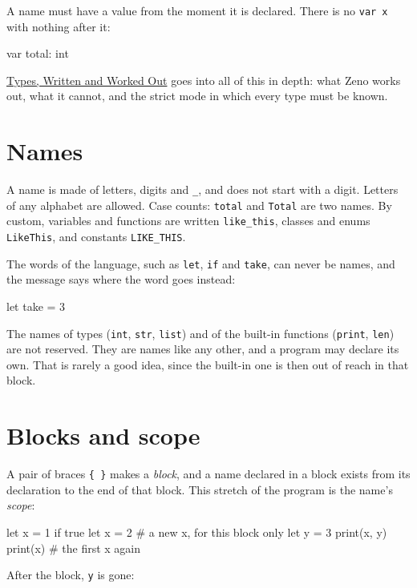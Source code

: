 A name must have a value from the moment it is declared. There is no
\verb|var x| with nothing after it:

\begin{zeno}[fails=yes]
var total: int
\end{zeno}

\hyperref[ch-types]{Types, Written and Worked Out} goes into all of
this in depth: what Zeno works out, what it cannot, and the strict
mode in which every type must be known.

\section{Names}

A name is made of letters, digits and \verb|_|, and does not start
with a digit. Letters of any alphabet are allowed. Case counts:
\verb|total| and \verb|Total| are two names. By custom, variables and
functions are written \verb|like_this|, classes and enums
\verb|LikeThis|, and constants \verb|LIKE_THIS|.

The words of the language, such as \verb|let|, \verb|if| and
\verb|take|, can never be names, and the message says where the word
goes instead:

\begin{zeno}[fails=yes]
let take = 3
\end{zeno}

The names of types (\verb|int|, \verb|str|, \verb|list|) and of the
built-in functions (\verb|print|, \verb|len|) are not reserved. They
are names like any other, and a program may declare its own. That is
rarely a good idea, since the built-in one is then out of reach in
that block.

\section{Blocks and scope}

A pair of braces \verb|{ }| makes a \emph{block}, and a name declared
in a block exists from its declaration to the end of that block. This
stretch of the program is the name's \emph{scope}:

\begin{zeno}
let x = 1
if true {
    let x = 2          # a new x, for this block only
    let y = 3
    print(x, y)
}
print(x)               # the first x again
\end{zeno}

After the block, \verb|y| is gone:

